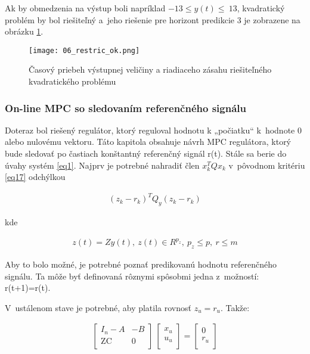 Ak by obmedzenia na výstup boli napríklad
\(- 13 \leq y\left( t \right) \leq \ 13\), kvadratický problém by bol
riešiteľný a~jeho riešenie pre horizont predikcie 3 je zobrazene na
obrázku \ref{06_restric_ok}.

\begin{figure}[!htbp]
\centering
\texttt{[image: 06\_restric\_ok.png]}
\caption{Časový priebeh výstupnej veličiny a riadiaceho zásahu riešiteľného kvadratického problému}
\label{06_restric_ok}
\end{figure}

\subsubsection{On-line MPC so sledovaním referenčného signálu}
Doteraz bol riešený regulátor, ktorý reguloval hodnotu k „počiatku``
k~hodnote 0 alebo nulovému vektoru. Táto kapitola obsahuje návrh MPC
regulátora, ktorý bude sledovať po častiach konštantný referenčný signál
r(t). Stále sa berie do úvahy systém \ref{eq1}. Najprv je potrebné nahradiť
člen \(x_{k}^{T}Qx_{k}\) v~pôvodnom kritériu \ref{eq17} odchýlkou

\begin{equation} \label{eq24}
\begin{split}
{(z_{k} - r_{k})}^{T}Q_{y}(z_{k} - r_{k})
\end{split}
\end{equation}

kde

\begin{equation} \label{eq25}
\begin{split}
z\left( t \right) = Zy\left( t \right),\ z\left( t \right) \in R^{p_{z}},\ p_{z} \leq p,\ r \leq m
\end{split}
\end{equation}

Aby to bolo možné, je potrebné poznať predikovanú hodnotu referenčného
signálu. Ta môže byť definovaná rôznymi spôsobmi jedna z~možností:
r(t+1)=r(t).

V~ustálenom stave je potrebné, aby platila rovnosť \(z_{u} = r_{u}\).
Takže:

\begin{equation} \label{eq26}
\begin{split}
\begin{bmatrix}
I_{n} - A & - B \\
\text{ZC} & 0 \\
\end{bmatrix}\ \begin{bmatrix}
x_{u} \\
u_{u} \\
\end{bmatrix} = \begin{bmatrix}
0 \\
r_{u} \\
\end{bmatrix}
\end{split}
\end{equation}



